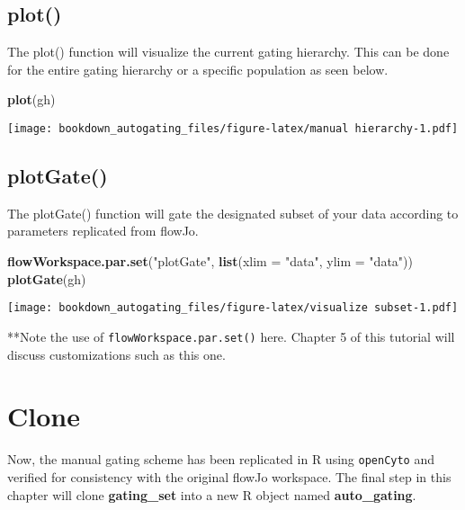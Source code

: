 \documentclass[]{book}
\newenvironment{Shaded}{\begin{snugshade}}{\end{snugshade}}
\newcommand{\DataTypeTok}[1]{\textcolor[rgb]{0.13,0.29,0.53}{#1}}
\newcommand{\KeywordTok}[1]{\textcolor[rgb]{0.13,0.29,0.53}{\textbf{#1}}}
\newcommand{\NormalTok}[1]{#1}
\newcommand{\StringTok}[1]{\textcolor[rgb]{0.31,0.60,0.02}{#1}}
\begin{document}
\hypertarget{plot}{%
\subsection{plot()}\label{plot}}

The plot() function will visualize the current gating hierarchy. This can be done for the entire gating hierarchy or a specific population as seen below.

\begin{Shaded}
\begin{Highlighting}[]
\KeywordTok{plot}\NormalTok{(gh)}
\end{Highlighting}
\end{Shaded}

\texttt{[image: bookdown\_autogating\_files/figure-latex/manual hierarchy-1.pdf]}

\hypertarget{plotgate}{%
\subsection{plotGate()}\label{plotgate}}

The plotGate() function will gate the designated subset of your data according to parameters replicated from flowJo.

\begin{Shaded}
\begin{Highlighting}[]
\KeywordTok{flowWorkspace.par.set}\NormalTok{(}\StringTok{"plotGate"}\NormalTok{, }\KeywordTok{list}\NormalTok{(}\DataTypeTok{xlim =} \StringTok{"data"}\NormalTok{,}
                                       \DataTypeTok{ylim =} \StringTok{"data"}\NormalTok{))}
\KeywordTok{plotGate}\NormalTok{(gh)}
\end{Highlighting}
\end{Shaded}

\texttt{[image: bookdown\_autogating\_files/figure-latex/visualize subset-1.pdf]}

**Note the use of \texttt{flowWorkspace.par.set()} here. Chapter 5 of this tutorial will discuss customizations such as this one.

\hypertarget{clone}{%
\section{Clone}\label{clone}}

Now, the manual gating scheme has been replicated in R using \texttt{openCyto} and verified for consistency with the original flowJo workspace. The final step in this chapter will clone \textbf{gating\_set} into a new R object named \textbf{auto\_gating}.
\end{document}
